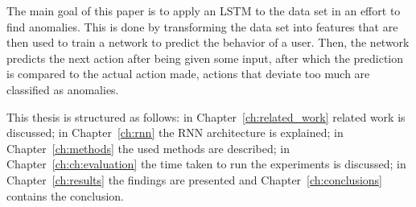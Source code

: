 The main goal of this paper is to apply an LSTM to the data set in an effort to find anomalies. This is done by transforming the data set into features that are then used to train a network to predict the behavior of a user. Then, the network  predicts the next action after being given some input, after which the prediction is compared to the actual action made, actions that deviate too much are classified as anomalies.

This thesis is structured as follows: in Chapter~\ref{ch:related_work} related work is discussed; in Chapter~\ref{ch:rnn} the RNN architecture is explained; in Chapter~\ref{ch:methods} the used methods are described; in Chapter~\ref{ch:ch:evaluation} the time taken to run the experiments is discussed; in Chapter~\ref{ch:results} the findings are presented and Chapter~\ref{ch:conclusions} contains the conclusion.